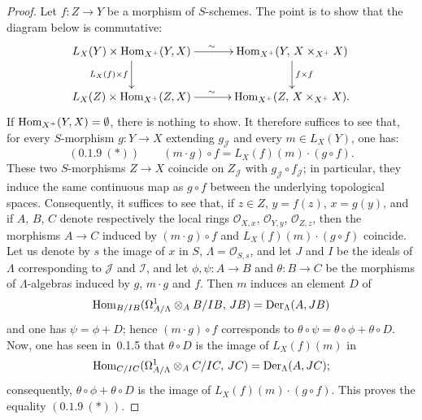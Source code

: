\begin{proof}
Let \(f\colon Z\to Y\) be a morphism of \(S\)-schemes. The point is to show
that the diagram below is commutative:
\[
\xymatrix@C=3.2em@R=2.4em{
L_{X}(Y)\times\Hom_{X^{+}}(Y,X)
  \ar[r]^{\sim}
  \ar[d]_{L_{X}(f)\times f}
& \Hom_{X^{+}}(Y,\,X\times_{X^{+}}X)
  \ar[d]^{f\times f}
\\
L_{X}(Z)\times\Hom_{X^{+}}(Z,X)
  \ar[r]^{\sim}
& \Hom_{X^{+}}(Z,\,X\times_{X^{+}}X).
}
\]
If \(\operatorname{Hom}_{X^{+}}(Y,X)=\emptyset\), there is nothing to show. It therefore
suffices to see that, for every \(S\)-morphism \(g\colon Y\to X\) extending
\(g_{\mathcal{J}}\) and every \(m\in L_{X}(Y)\), one has:
\[
(0.1.9\ (*))\qquad (m\cdot g)\circ f=L_{X}(f)(m)\cdot(g\circ f).
\]
These two \(S\)-morphisms \(Z\to X\) coincide on \(Z_{\mathcal{J}}\) with
\(g_{\mathcal{J}}\circ f_{\mathcal{J}}\); in particular, they induce the
same continuous map as \(g\circ f\) between the underlying topological
spaces. Consequently, it suffices to see that, if \(z\in Z\), \(y=f(z)\),
\(x=g(y)\), and if \(A\), \(B\), \(C\) denote respectively the local rings
\(\mathcal{O}_{X,x}\), \(\mathcal{O}_{Y,y}\), \(\mathcal{O}_{Z,z}\), then
the morphisms \(A\to C\) induced by \((m\cdot g)\circ f\) and
\(L_{X}(f)(m)\cdot(g\circ f)\) coincide. Let us denote by \(s\) the
image of \(x\) in \(S\), \(\Lambda=\mathcal{O}_{S,s}\), and let \(J\) and
\(I\) be the ideals of \(\Lambda\) corresponding to \(\mathcal{J}\) and
\(\mathcal{I}\), and let \(\phi,\psi\colon A\to B\) and \(\theta\colon B\to C\)
be the morphisms of \(\Lambda\)-algebras induced by \(g\), \(m\cdot g\) and
\(f\). Then \(m\) induces an element \(D\) of
\[
\operatorname{Hom}_{B/IB}(\Omega^{1}_{A/\Lambda}\otimes_{A}B/IB,\,JB)
=\operatorname{Der}_{\Lambda}(A,JB)
\]
and one has \(\psi=\phi+D\); hence \((m\cdot g)\circ f\) corresponds to
\(\theta\circ\psi=\theta\circ\phi+\theta\circ D\). Now, one has seen in~0.1.5
that \(\theta\circ D\) is the image of \(L_{X}(f)(m)\) in
\[
\operatorname{Hom}_{C/IC}(\Omega^{1}_{A/\Lambda}\otimes_{A}C/IC,\,JC)
=\operatorname{Der}_{\Lambda}(A,JC);
\]
consequently, \(\theta\circ\phi+\theta\circ D\) is the image of
\(L_{X}(f)(m)\cdot(g\circ f)\). This proves the equality
\((0.1.9\ (*))\).
\end{proof}

